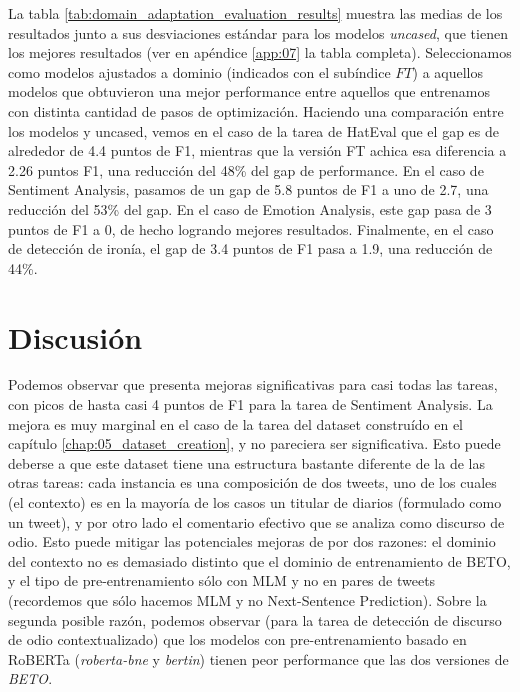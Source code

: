 La tabla \ref{tab:domain_adaptation_evaluation_results} muestra las medias de los resultados junto a sus desviaciones estándar para los modelos \emph{uncased}, que tienen los mejores resultados (ver en apéndice \ref{app:07} la tabla completa). Seleccionamos como modelos ajustados a dominio (indicados con el subíndice $FT$) a aquellos modelos que obtuvieron una mejor performance entre aquellos que entrenamos con distinta cantidad de pasos de optimización. Haciendo una comparación entre los modelos \beto{} y \robertuito{} uncased, vemos en el caso de la tarea de HatEval que el gap es de alrededor de 4.4 puntos de F1, mientras que la versión FT achica esa diferencia a 2.26 puntos F1, una reducción del 48\% del gap de performance. En el caso de Sentiment Analysis, pasamos de un gap de 5.8 puntos de F1 a uno de 2.7, una reducción del 53\% del gap. En el caso de Emotion Analysis, este gap pasa de 3 puntos de F1 a 0, de hecho logrando mejores resultados. Finalmente, en el caso de detección de ironía, el gap de 3.4 puntos de F1 pasa a 1.9, una reducción de 44\%.




\section{Discusión}

Podemos observar que \robertuito{} presenta mejoras significativas para casi todas las tareas, con picos de hasta casi 4 puntos de F1 para la tarea de Sentiment Analysis. La mejora es muy marginal en el caso de la tarea del dataset construído en el capítulo \ref{chap:05_dataset_creation}, y no pareciera ser significativa. Esto puede deberse a que este dataset tiene una estructura bastante diferente de la de las otras tareas: cada instancia es una composición de dos tweets, uno de los cuales (el contexto) es en la mayoría de los casos un titular de diarios (formulado como un tweet), y por otro lado el comentario efectivo que se analiza como discurso de odio. Esto puede mitigar las potenciales mejoras de \robertuito{} por dos razones: el dominio del contexto no es demasiado distinto que el dominio de entrenamiento de BETO, y el tipo de pre-entrenamiento sólo con MLM y no en pares de tweets (recordemos que sólo hacemos MLM y no Next-Sentence Prediction). Sobre la segunda posible razón, podemos observar (para la tarea de detección de discurso de odio contextualizado) que los modelos con pre-entrenamiento basado en RoBERTa (\emph{roberta-bne} y \emph{bertin}) tienen peor performance que las dos versiones de \emph{BETO}.

